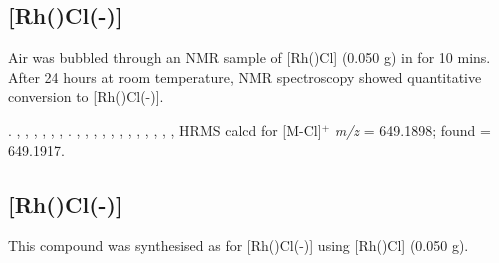
\subsection*{\texorpdfstring{[Rh(\tBusixantphos)Cl(-)]} R}


Air was bubbled through an NMR sample of [Rh(\tBusixantphos)Cl] (0.050 g) in  for 10 mins.  After 24 hours at room temperature, NMR spectroscopy showed quantitative conversion to [Rh(\tBusixantphos)Cl(-)].

.
,
,
,
,
,
,
.
,
,
,
,
,
,
,
,
,
,
,
,
HRMS calcd for  [M-Cl]$^+$ \emph{m/z} = 649.1898; found = 649.1917.


\subsection*{\texorpdfstring{[Rh(\tButhixantphos)Cl(-)]} R}


This compound was synthesised as for [Rh(\tBusixantphos)Cl(-)] using [Rh(\tButhixantphos)Cl] (0.050 g).

